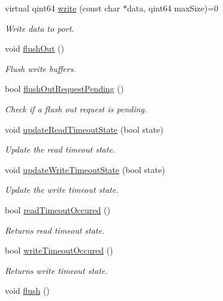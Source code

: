 \begin{DoxyCompactItemize}
virtual qint64 \hyperlink{classmdt_abstract_port_a64d4802975a76474b9196c91f57a6d90}{write} (const char $\ast$data, qint64 maxSize)=0
\begin{DoxyCompactList}\small\item\em Write data to port. \end{DoxyCompactList}\item 
void \hyperlink{classmdt_abstract_port_ad199c6310801893f1f7de2a2391606fc}{flushOut} ()
\begin{DoxyCompactList}\small\item\em Flush write buffers. \end{DoxyCompactList}\item 
bool \hyperlink{classmdt_abstract_port_a2cc79d9288bebafaa183753dcf0807f3}{flushOutRequestPending} ()
\begin{DoxyCompactList}\small\item\em Check if a flush out request is pending. \end{DoxyCompactList}\item 
void \hyperlink{classmdt_abstract_port_a0fc7317e988d5dea53a999cd1bf4faa9}{updateReadTimeoutState} (bool state)
\begin{DoxyCompactList}\small\item\em Update the read timeout state. \end{DoxyCompactList}\item 
void \hyperlink{classmdt_abstract_port_ab51135de1f7bbc4707c3284f924c98dc}{updateWriteTimeoutState} (bool state)
\begin{DoxyCompactList}\small\item\em Update the write timeout state. \end{DoxyCompactList}\item 
bool \hyperlink{classmdt_abstract_port_aec94143165e486cbbe6e0979be887c7e}{readTimeoutOccured} ()
\begin{DoxyCompactList}\small\item\em Returns read timeout state. \end{DoxyCompactList}\item 
bool \hyperlink{classmdt_abstract_port_a7c05a1abe77f0c3c334016c6ad866f67}{writeTimeoutOccured} ()
\begin{DoxyCompactList}\small\item\em Returns write timeout state. \end{DoxyCompactList}\item 
void \hyperlink{classmdt_abstract_port_abde440c49b95833f821e1333c40a7398}{flush} ()

\end{DoxyCompactItemize}
